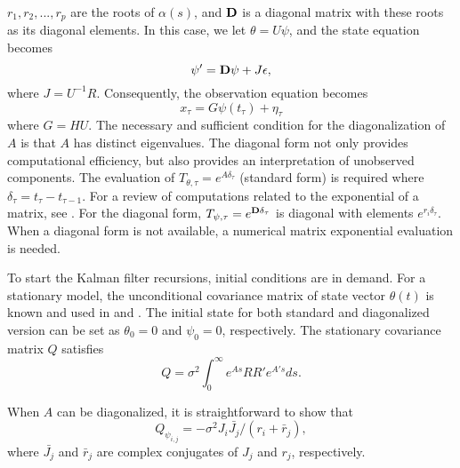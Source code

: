 $r_1, r_2, ..., r_p$ are the roots of $\alpha(s)$, and $\bold{D}$ is a diagonal matrix with these roots as its diagonal elements. In this case, we let $\theta=U\psi$, and the state equation becomes
\begin{equation}\label{E:stadiag}
\psi'=\bold{D}\psi+J\epsilon,
\end{equation}
where $J=U^{-1}R$. Consequently, the observation equation becomes 
\begin{equation}
x_{\tau}=G\psi(t_{\tau})+\eta_{\tau}
\end{equation}
where $G=HU$. The necessary and sufficient condition for the diagonalization of $A$ is that $A$ has distinct eigenvalues. %
The diagonal form not only provides computational efficiency, but also provides an interpretation of unobserved components.
 The evaluation of $T_{\theta,\tau}=e^{A\delta_\tau}$ (standard form) is required where $\delta_\tau=t_\tau-t_{\tau-1}$. %
 For a review of computations related to the exponential of a matrix, see \citet{Mole:Loan:2003}. For the diagonal form, $T_{\psi,\tau}=e^{\bold{D}\delta_\tau}$ is diagonal with elements $e^{r_i\delta_\tau}$. When a diagonal form is not available, a numerical matrix exponential evaluation is needed.

To start the Kalman filter recursions, initial conditions are in demand. For a stationary model, the unconditional covariance matrix of state vector $\theta(t)$ is known \citep{Doob:1953} and used in \citet{Jone:1981} and \citet[\S9.1]{Harv:1990}. The initial state for both standard and diagonalized version can be set as $\theta_0=0$ and $\psi_0=0$, respectively. The stationary covariance matrix $Q$ satisfies
\begin{equation}\label{E:Q}
Q=\sigma^2\int_{0}^{\infty}e^{As}RR'e^{A's}ds.
\end{equation}

When $A$ can be diagonalized, it is straightforward to show that
\begin{equation}\label{E:Qini}
Q_{\psi_{i,j}}=-\sigma^2J_i \bar{J_j}/(r_i+\bar{r}_j),
\end{equation}
where $\bar{J_j}$ and $\bar{r}_j$ are complex conjugates of $J_j$ and $r_j$, respectively.

